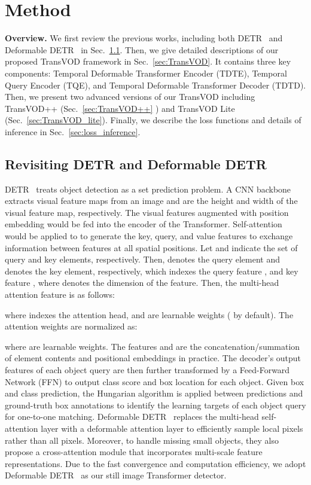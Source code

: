 \documentclass[10pt,journal,compsoc]{IEEEtran}
\begin{document}
\section{Method}
\label{sec:method}

\noindent
\textbf{Overview.} We first review the previous works, including both DETR~\cite{detr} and Deformable DETR~\cite{zhu2020deformable} in Sec.~\ref{sec:DETR}. Then, we give detailed descriptions of our proposed TransVOD framework in Sec.~\ref{sec:TransVOD}. It contains three key components: Temporal Deformable Transformer Encoder (TDTE), Temporal Query Encoder (TQE), and Temporal Deformable Transformer Decoder (TDTD). Then, we present two advanced versions of our TransVOD including TransVOD++ (Sec.~\ref{sec:TransVOD++} ) and TransVOD Lite (Sec.~\ref{sec:TransVOD_lite}). Finally, we describe the loss functions and details of inference in Sec.~\ref{sec:loss_inference}. 

\subsection{Revisiting DETR and Deformable DETR}
\label{sec:DETR}
DETR~\cite{detr} treats object detection as a set prediction problem. A CNN backbone~\cite{he16res} extracts visual feature maps  from an image and  are the height and width of the visual feature map, respectively. The visual features augmented with position embedding  would be fed into the encoder of the Transformer. Self-attention would be applied to  to generate the key, query, and value features  to exchange information between features at all spatial positions.
Let  and  indicate the set of query and key elements, respectively. Then,  denotes the query element and  denotes the key element, respectively, which indexes the query feature , and key feature , where  denotes the dimension of the feature.  Then, the multi-head attention feature is as follows:

where  indexes the attention head,  and  are learnable weights ( by default). The attention weights  are normalized as:

where  are learnable weights. The features  and  are the concatenation/summation of element contents and positional embeddings in practice. 
The decoder's output features of each object query are then further transformed by a Feed-Forward Network (FFN) to output class score and box location for each object. Given box and class prediction, the Hungarian algorithm is applied between predictions and ground-truth box annotations to identify the learning targets of each object query for one-to-one matching. Deformable DETR~\cite{zhu2020deformable} replaces the multi-head self-attention layer with a deformable attention layer to efficiently sample local pixels rather than all pixels. Moreover, to handle missing small objects, they also propose a cross-attention module that incorporates multi-scale feature representations. Due to the fast convergence and computation efficiency, we adopt Deformable DETR~\cite{zhu2020deformable} as our still image Transformer detector.
\end{document}
